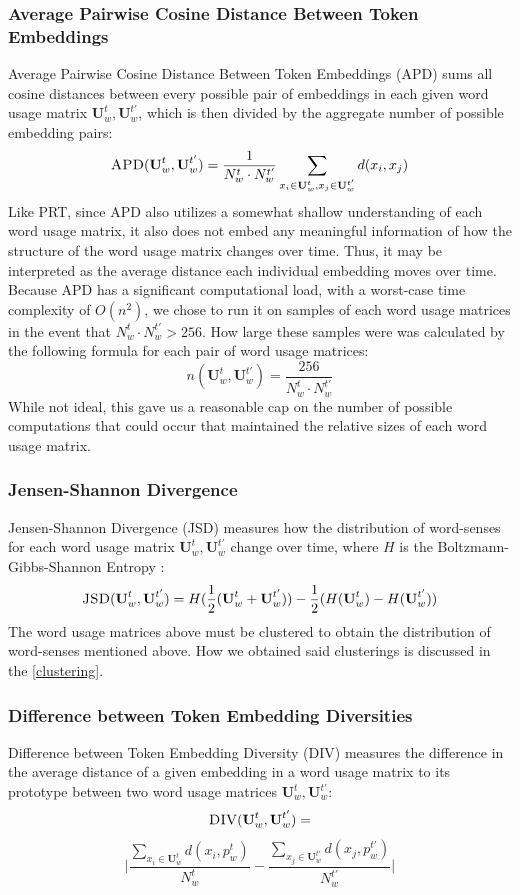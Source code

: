 \documentclass[10pt, a4paper]{article}
\begin{document}
\subsubsection{Average Pairwise Cosine Distance Between Token Embeddings}
Average Pairwise Cosine Distance Between Token Embeddings (APD) sums all cosine distances between every possible pair of embeddings in each given word usage matrix $\textbf{U}^{t}_w, \textbf{U}^{t'}_w$, which is then divided by the aggregate number of possible embedding pairs:
$$\textsc{APD}(\textbf{U}^{t}_w, \textbf{U}^{t'}_w) = \frac{1}{N^{t}_w \cdot N^{t'}_w} \sum_{x_i \in \textbf{U}^{t}_w, x_j \in \textbf{U}^{t'}_w} d(x_i, x_j)$$
Like PRT, since APD also utilizes a somewhat shallow understanding of each word usage matrix, it also does not embed any meaningful information of how the structure of the word usage matrix changes over time. Thus, it may be interpreted as the average distance each individual embedding moves over time.\\

Because APD has a significant computational load, with a worst-case time complexity of $O(n^2)$, we chose to run it on samples of each word usage matrices in the event that $N^{t}_w \cdot N^{t'}_w > 256$. How large these samples were was calculated by the following formula for each pair of word usage matrices:
$$n(\textbf{U}^{t}_w, \textbf{U}^{t'}_w) = \frac{256}{N^{t}_w \cdot N^{t'}_w}$$
While not ideal, this gave us a reasonable cap on the number of possible computations that could occur that maintained the relative sizes of each word usage matrix. %

\subsubsection{Jensen-Shannon Divergence}
\label{JSD}
Jensen-Shannon Divergence (JSD) measures how the distribution of word-senses for each word usage matrix $\textbf{U}^{t}_w, \textbf{U}^{t'}_w$ change over time, where $H$ is the Boltzmann-Gibbs-Shannon Entropy \cite{jensenshannon}:
\small $$\textsc{JSD}(\textbf{U}^{t}_w, \textbf{U}^{t'}_w) = H(\frac{1}{2}(\textbf{U}^{t}_w + \textbf{U}^{t'}_w)) - \frac{1}{2}(H(\textbf{U}^{t}_w) - H(\textbf{U}^{t'}_w))$$
The word usage matrices above must be clustered to obtain the distribution of word-senses mentioned above. How we obtained said clusterings is discussed in the \ref{clustering}.
\subsubsection{Difference between Token Embedding Diversities}
Difference between Token Embedding Diversity (DIV) measures the difference in the average distance of a given embedding in a word usage matrix to its prototype between two word usage matrices $\textbf{U}^{t}_w, \textbf{U}^{t'}_w$:
$$\textsc{DIV}(\textbf{U}^{t}_w, \textbf{U}^{t'}_w) = $$ 
$$\Bigg | \frac{\sum_{x_i \in \textbf{U}^{t}_w} d(x_i, p^{t}_w)}{N^{t}_w} - \frac{\sum_{x_j \in \textbf{U}^{t'}_w} d(x_j, p^{t'}_w)}{N^{t'}_w} \Bigg |$$
\end{document}
